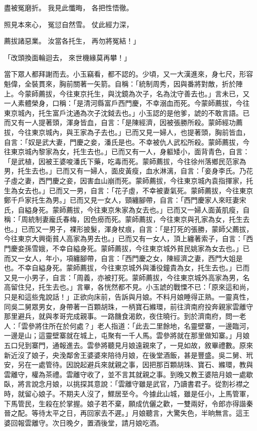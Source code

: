 盡被冤磨折。  我見此懺晦，  各把性悟徹。

照見本來心，  冤愆自然雪。  仗此經力深，

薦拔諸惡業。  汝當各托生，  再勿將冤結！」

「改頭換面輪迴去，  來世機緣莫再攀！」

當下眾人都拜謝而去。小玉竊看，都不認的。少頃，又一大漢進來，身七尺，形容魁偉，全裝貫來，胸前關著一矢箭。自稱：「統制周秀，因與番將對敵，折於陣上。今蒙師薦拔，今往東京托生，與沈鏡為次子，名為沈守善去也。」言未已，又一人素體榮身，口稱：「是清河縣富戶西門慶，不幸溺血而死。今蒙師薦拔，今往東京城內，托生富戶沈通為次子沈鉞去也。」小玉認的是他爹，諕的不敢言語。已而又有一人提著頭，渾身皆血，自言：「是陳經濟，因被張勝所殺。蒙師經功薦拔，今往東京城內，與王家為子去也。」已而又見一婦人，也提著頭，胸前皆血，自言：「奴是武大妻，門慶之妾，潘氏是也。不幸被仇人武松所殺。蒙師薦拔，今往東京城內黎家為女，托生去也。」已而又有一人，身軀矮小，面背青色，自言：「是武植，因被王婆唆潘氏下藥，吃毒而死。蒙師薦拔，今往徐州落鄉民范家為男，托生去也。」已而又有一婦人，面皮黃瘦，血水淋漓，自言：「妾身李氏。乃花子虛之妻，西門慶之妾，因害血山崩而死。蒙師薦拔，今往東京城內袁指揮家，托生為女去也。」已而又一男，自言：「花子虛，不幸被妻氣死。蒙師薦拔，今往東京鄭千戶家托生為男。」已而又見一女人，頸纏腳帶，自言：「西門慶家人來旺妻宋氏，自縊身死。蒙師薦拔，今往東京朱家為女去也。」已而又一婦人面黃肌瘦，自稱：「周統制妻龐氏春梅，因色癆而死。蒙師薦拔，今往東京與孔家為女，托生去也。」已而又一男子，裸形披髮，渾身杖痕，自言：「是打死的張勝，蒙師父薦拔，今往東京大興衛貧人高家為男去也。」已而又有一女人，頂上纏著索子，自言：「西門慶妾孫雪娥，不幸自縊身死。蒙師薦拔，今往東京城外貧民姚家為女去也。」已而又一女人，年小，項纏腳帶，自言：「西門慶之女，陳經濟之妻，西門大姐是也。不幸自縊身死。蒙師薦拔，今往東京城外與潘役鐘貴為女，托生去也。」已而又見一小男子，自言：「周義，亦被打死。蒙師薦拔，今往東京城外高家為男，名高留住兒，托生去也。」言畢，各恍然都不見。小玉諕的戰慄不已：「原來這和尚，只是和這些鬼說話！」正欲向床前，告訴與月娘。不料月娘睡得正熟。一靈真性，同吳二舅眾男女，身帶著一百顆胡珠，一柄寶石縧環，前往濟南府投奔親家雲離守那里避兵，就與孝哥完成親事。一路饑食渴飲，夜住曉行。到於濟南府，問一老人：「雲參將住所在於何處？」老人指道：「此去二里餘地，名靈壁寨，一邊臨河，一邊是山；這靈壁寨就在城上，屯聚有一千人馬。雲參將就在那里做知寨。」月娘五口兒到寨門，通報進去。雲參將聽見月娘遠親來了，一見如故，敘畢禮數。原來新近沒了娘子，央浼鄰舍王婆婆來陪待月娘，在後堂酒飯，甚是豐盛。吳二舅、玳安，另在一處管待。因說起避兵來就親之事，因把那百顆胡珠、寶石、縧環，教與雲離守，權為茶禮。雲離守收了，並不言其就親之事。到晚又教王婆陪月娘一處歇臥，將言說念月娘，以挑探其意說：「雲離守雖是武官，乃讀書君子。從割衫襟之時，就留心娘子。不期夫人沒了，鰥居至今。今據此山城，雖是任小，上馬管軍，下馬管民，生殺在於掌握。娘子若不棄，願成伉儷之歡，一雙兩好，令郎亦得諧秦晉之配。等待太平之日，再回家去不遲。」月娘聽言，大驚失色，半晌無言。這王婆回報雲離守。次日晚夕，置酒後堂，請月娘吃酒。